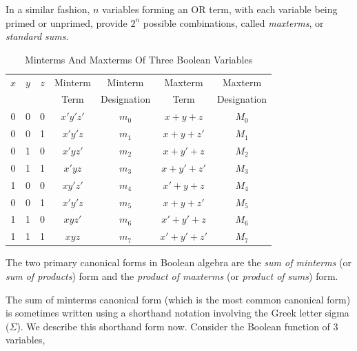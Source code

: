 In a similar fashion, $n$ variables forming an OR term, with each variable 
being primed or unprimed, provide $2^n$ possible combinations, called
\emph{maxterms}, or
\emph{standard sums}.

\begin{table}
\caption{Minterms And Maxterms Of Three Boolean Variables}
\label{tbl:cbal0:ssam0:scas0:01}
\begin{center}
\begin{tabular}{|c|c|c||c|c||c|c|}
\hline
 $x$ & $y$ & $z$ & \small{Minterm} &  \small{Minterm}     & \small{Maxterm} & \small{Maxterm}     \\
     &     &     & \small{Term}    &  \small{Designation} & \small{Term}    & \small{Designation} \\
\hline
  0  &  0  &  0  & $x'y'z'$        &  $m_0$               & $x+y+z$         & $M_0$               \\
\hline
  0  &  0  &  1  & $x'y'z$         &  $m_1$               & $x+y+z'$        & $M_1$               \\
\hline
  0  &  1  &  0  & $x'yz'$         &  $m_2$               & $x+y'+z$        & $M_2$               \\
\hline
  0  &  1  &  1  & $x'yz$          &  $m_3$               & $x+y'+z'$       & $M_3$               \\
\hline
  1  &  0  &  0  & $xy'z'$         &  $m_4$               & $x'+y+z$        & $M_4$               \\
\hline
  0  &  0  &  1  & $x'y'z$         &  $m_5$               & $x+y+z'$        & $M_5$               \\
\hline
  1  &  1  &  0  & $xyz'$          &  $m_6$               & $x'+y'+z$       & $M_6$               \\
\hline
  1  &  1  &  1  & $xyz$           &  $m_7$               & $x'+y'+z'$      & $M_7$               \\
\hline
\end{tabular}
\end{center}
\end{table}

The two primary canonical forms in Boolean algebra are the
\emph{sum of minterms} (or \emph{sum of products}) form and the
\emph{product of maxterms} (or \emph{product of sums}) form.

The sum of minterms canonical form (which is the most common
canonical form) is sometimes written using a shorthand 
notation involving the Greek letter sigma ($\Sigma$).  We describe this
shorthand form now.  Consider the Boolean function of 3 variables,

